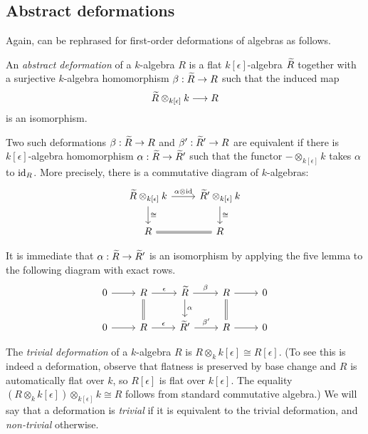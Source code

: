 \subsection{Abstract deformations}

Again,  can be rephrased for first-order
deformations of algebras as follows. 

\begin{definition} \label{def-defalgebra}
    An \textit{abstract deformation} of a \(k\)-algebra $R$ is a flat
    $k[\epsilon]$-algebra $\widetilde{R}$ together with a surjective $k$-algebra
    homomorphism $\beta:\widetilde{R}\to R$ such that the induced map 
    \[\widetilde{R}\otimes_{k[\epsilon]}k\longrightarrow R\]
    is an isomorphism.
\end{definition}

Two such deformations $\beta:\widetilde{R}\to R$ and $\beta':\widetilde{R}'\to R$ are equivalent if
there is $k[\epsilon]$-algebra homomorphism $\alpha:\widetilde{R}\to\widetilde{R}'$ such that
the functor $-\otimes_{k[\epsilon]}k$ takes $\alpha$ to $\text{id}_{R}$. More
precisely, there is a commutative diagram of $k$-algebras:
\[\begin{tikzcd}
    \wt{R}\otimes_{k[\epsilon]}k \arrow[r,"\alpha\otimes \text{id}"] \arrow[d,"\cong"] &
    \wt{R}'\otimes_{k[\epsilon]}k \arrow[d,"\cong"] \\
    R \arrow[r, Rightarrow, no head] & R
\end{tikzcd}\]

It is immediate that \(\alpha:\widetilde{R}\rightarrow \widetilde{R}'\) is an isomorphism by
applying the five lemma to the following diagram with exact rows.  
\[\begin{tikzcd} 
    0 & R\arrow[d, Rightarrow, no head] & {\widetilde{R}} & R\arrow[d,
    Rightarrow, no head] & 0 \\ 
    0 & R & {\widetilde{R}'} & R & 0 
    \arrow[from=1-1, to=1-2] 
    \arrow["\epsilon", from=1-2, to=1-3]
    \arrow["\beta", from=1-3, to=1-4]
    \arrow[from=1-4, to=1-5]
    \arrow[from=2-1, to=2-2]
    \arrow["\epsilon", from=2-2, to=2-3]
    \arrow["\beta'", from=2-3, to=2-4]
    \arrow[from=2-4, to=2-5]
    \arrow["\alpha", from=1-3, to=2-3] 
\end{tikzcd}\] 

 The \textit{trivial deformation} of a $k$-algebra $R$ is
 $R\otimes_kk[\epsilon]\cong R[\epsilon]$. (To see this is indeed a deformation,
 observe that flatness is preserved by base change and $R$ is automatically flat
 over $k$, so $R[\epsilon]$ is flat over $k[\epsilon]$.
 The equality \((R\otimes_kk[\epsilon])\otimes_{k[\epsilon]}k\cong R\) follows
 from standard commutative algebra.) We will say that a deformation is
 \textit{trivial} if it is equivalent to the trivial deformation, and
 \textit{non-trivial} otherwise. 

